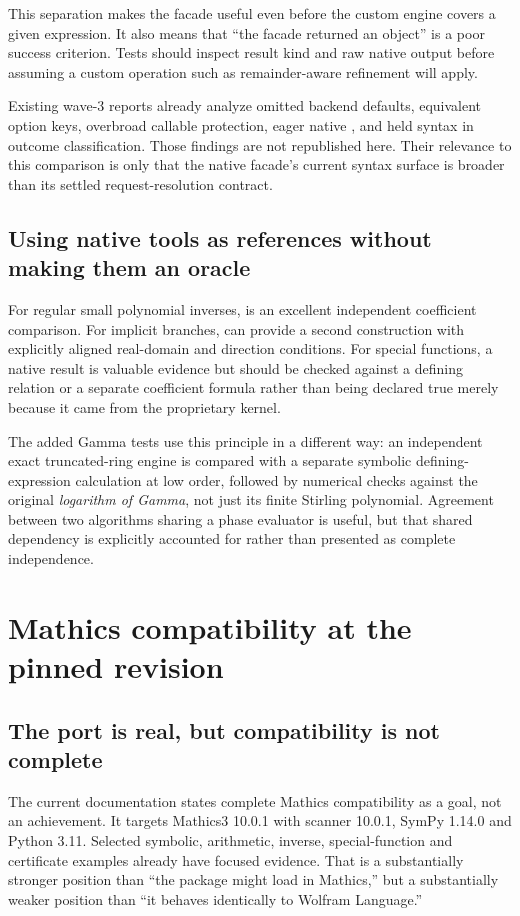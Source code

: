 \documentclass[11pt,letterpaper]{article}
\newcommand{\code}[1]{\texttt{\detokenize{#1}}}
\begin{document}
This separation makes the facade useful even before the custom engine covers a given expression. It also means that ``the facade returned an object'' is a poor success criterion. Tests should inspect result kind and raw native output before assuming a custom operation such as remainder-aware refinement will apply.

Existing wave-3 reports already analyze omitted backend defaults, equivalent option keys, overbroad callable protection, eager native \code{Normal}, and held syntax in outcome classification. Those findings are not republished here. Their relevance to this comparison is only that the native facade's current syntax surface is broader than its settled request-resolution contract.\cite{wave3}

\subsection{Using native tools as references without making them an oracle}
For regular small polynomial inverses, \code{InverseSeries} is an excellent independent coefficient comparison. For implicit branches, \code{AsymptoticSolve} can provide a second construction with explicitly aligned real-domain and direction conditions. For special functions, a native result is valuable evidence but should be checked against a defining relation or a separate coefficient formula rather than being declared true merely because it came from the proprietary kernel.\cite{wlinverseseries,wlasolve}

The added Gamma tests use this principle in a different way: an independent exact truncated-ring engine is compared with a separate symbolic defining-expression calculation at low order, followed by numerical checks against the original \emph{logarithm of Gamma}, not just its finite Stirling polynomial. Agreement between two algorithms sharing a phase evaluator is useful, but that shared dependency is explicitly accounted for rather than presented as complete independence.

\section{Mathics compatibility at the pinned revision}
\subsection{The port is real, but compatibility is not complete}
The current documentation states complete Mathics compatibility as a goal, not an achievement. It targets Mathics3 10.0.1 with scanner 10.0.1, SymPy 1.14.0 and Python 3.11. Selected symbolic, arithmetic, inverse, special-function and certificate examples already have focused evidence. That is a substantially stronger position than ``the package might load in Mathics,'' but a substantially weaker position than ``it behaves identically to Wolfram Language.''\cite{mathicsdocs,mathics}
\end{document}

